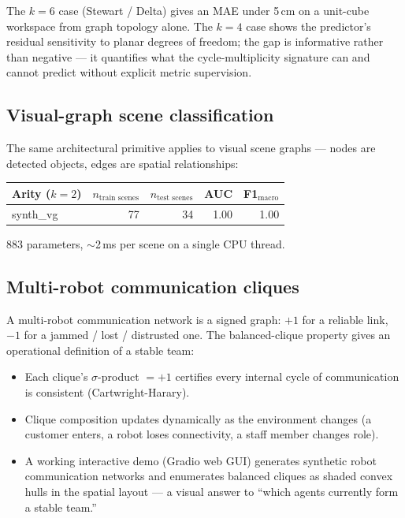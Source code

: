 \documentclass[11pt,a4paper]{article}
\newcommand{\sig}{\ensuremath{\sigma}}
\begin{document}
The $k = 6$ case (Stewart / Delta) gives an MAE under 5\,cm on a
unit-cube workspace from graph topology alone. The $k = 4$ case
shows the predictor's residual sensitivity to planar degrees of
freedom; the gap is informative rather than negative --- it
quantifies what the cycle-multiplicity signature can and cannot
predict without explicit metric supervision.

\subsection{Visual-graph scene classification}

The same architectural primitive applies to visual scene graphs ---
nodes are detected objects, edges are spatial relationships:

\begin{center}
\begin{tabular}{lrrrr}
\toprule
Arity ($k = 2$) & $n_\text{train scenes}$ & $n_\text{test scenes}$ & AUC & F1$_\text{macro}$ \\
\midrule
synth\_vg       & 77                       & 34                      & 1.00 & 1.00 \\
\bottomrule
\end{tabular}
\end{center}

883 parameters, $\sim$2\,ms per scene on a single CPU thread.

\subsection{Multi-robot communication cliques}

A multi-robot communication network is a signed graph: $+1$ for a
reliable link, $-1$ for a jammed / lost / distrusted one. The
balanced-clique property gives an operational definition of a
stable team:

\begin{itemize}
  \item Each clique's $\sig$-product $= +1$ certifies every
    internal cycle of communication is consistent (Cartwright-Harary).
  \item Clique composition updates dynamically as the environment
    changes (a customer enters, a robot loses connectivity, a staff
    member changes role).
  \item A working interactive demo (Gradio web GUI) generates
    synthetic robot communication networks and enumerates balanced
    cliques as shaded convex hulls in the spatial layout --- a
    visual answer to ``which agents currently form a stable team.''
\end{itemize}
\end{document}

